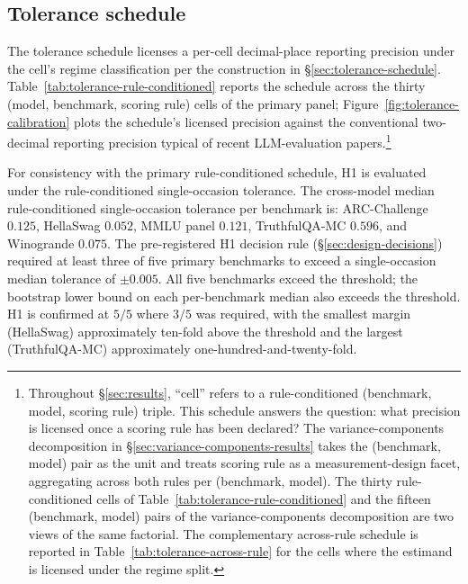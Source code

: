 \documentclass[11pt]{article}
\begin{document}
\subsection{Tolerance schedule}
\label{sec:tolerance-schedule-results}

The tolerance schedule licenses a per-cell decimal-place reporting precision under the cell's regime classification per the construction in §\ref{sec:tolerance-schedule}. Table~\ref{tab:tolerance-rule-conditioned} reports the schedule across the thirty (model, benchmark, scoring rule) cells of the primary panel; Figure~\ref{fig:tolerance-calibration} plots the schedule's licensed precision against the conventional two-decimal reporting precision typical of recent LLM-evaluation papers.\footnote{Throughout §\ref{sec:results}, ``cell'' refers to a rule-conditioned (benchmark, model, scoring rule) triple. This schedule answers the question: what precision is licensed once a scoring rule has been declared? The variance-components decomposition in §\ref{sec:variance-components-results} takes the (benchmark, model) pair as the unit and treats scoring rule as a measurement-design facet, aggregating across both rules per (benchmark, model). The thirty rule-conditioned cells of Table~\ref{tab:tolerance-rule-conditioned} and the fifteen (benchmark, model) pairs of the variance-components decomposition are two views of the same factorial. The complementary across-rule schedule is reported in Table~\ref{tab:tolerance-across-rule} for the cells where the estimand is licensed under the regime split.}

For consistency with the primary rule-conditioned schedule, H1 is evaluated under the rule-conditioned single-occasion tolerance. The cross-model median rule-conditioned single-occasion tolerance per benchmark is: ARC-Challenge $0.125$, HellaSwag $0.052$, MMLU panel $0.121$, TruthfulQA-MC $0.596$, and Winogrande $0.075$. The pre-registered H1 decision rule (§\ref{sec:design-decisions}) required at least three of five primary benchmarks to exceed a single-occasion median tolerance of $\pm 0.005$. All five benchmarks exceed the threshold; the bootstrap lower bound on each per-benchmark median also exceeds the threshold. H1 is confirmed at $5/5$ where $3/5$ was required, with the smallest margin (HellaSwag) approximately ten-fold above the threshold and the largest (TruthfulQA-MC) approximately one-hundred-and-twenty-fold.
\end{document}
